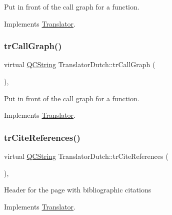Put in front of the call graph for a function. 

Implements \mbox{\hyperlink{class_translator}{Translator}}.

\mbox{\label{class_translator_dutch_a8328b25580e3288802d87346b5b0bae5}} 
\subsubsection{\texorpdfstring{trCallGraph()}{trCallGraph()}}
{\footnotesize\ttfamily virtual \mbox{\hyperlink{class_q_c_string}{Q\+C\+String}} Translator\+Dutch\+::tr\+Call\+Graph (\begin{DoxyParamCaption}{ }\end{DoxyParamCaption})\hspace{0.3cm}{\ttfamily [inline]}, {\ttfamily [virtual]}}

Put in front of the call graph for a function. 

Implements \mbox{\hyperlink{class_translator}{Translator}}.

\mbox{\label{class_translator_dutch_a7dcbb963bda45717faff39aceda64f9b}} 
\subsubsection{\texorpdfstring{trCiteReferences()}{trCiteReferences()}}
{\footnotesize\ttfamily virtual \mbox{\hyperlink{class_q_c_string}{Q\+C\+String}} Translator\+Dutch\+::tr\+Cite\+References (\begin{DoxyParamCaption}{ }\end{DoxyParamCaption})\hspace{0.3cm}{\ttfamily [inline]}, {\ttfamily [virtual]}}

Header for the page with bibliographic citations 

Implements \mbox{\hyperlink{class_translator}{Translator}}.

\mbox{\label{class_translator_dutch_ae5c72fc8e607d48f0f1084108a662f34}} 
